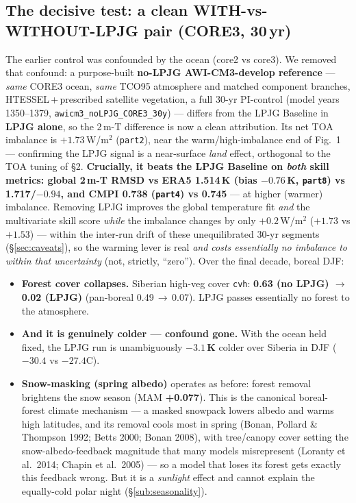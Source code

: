 \documentclass[10pt]{article}
\begin{document}
\subsection{The decisive test: a clean WITH-vs-WITHOUT-LPJG pair (CORE3, 30\,yr)}\label{sub:withwithout}
The earlier control was confounded by the ocean (core2 vs core3). We removed that confound: a purpose-built
\textbf{no-LPJG AWI-CM3-develop reference} --- \emph{same} CORE3 ocean, \emph{same} TCO95 atmosphere and matched
component branches, HTESSEL\,+\,prescribed satellite vegetation, a full 30-yr PI-control (model years 1350--1379,
\texttt{awicm3\_noLPJG\_CORE3\_30y}) --- differs from the LPJG Baseline in \textbf{LPJG alone}, so the 2\,m-T
difference is now a clean attribution. Its net TOA imbalance is $+1.73$\,W/m$^2$ (\texttt{part2}), near the
warm/high-imbalance end of Fig.~1 --- confirming the LPJG signal is a near-surface \emph{land} effect, orthogonal
to the TOA tuning of \S2. \textbf{Crucially, it beats the LPJG Baseline on \emph{both} skill metrics: global 2\,m-T RMSD vs ERA5 1.514\,K
(bias $-0.76$\,K, \texttt{part8}) vs 1.717/$-0.94$, and CMPI 0.738 (\texttt{part4}) vs 0.745} --- at higher
(warmer) imbalance. Removing LPJG improves the global temperature fit \emph{and} the multivariate skill score
\emph{while} the imbalance changes by only $+0.2$\,W/m$^2$ ($+1.73$ vs $+1.53$) --- within the inter-run drift of
these unequilibrated 30-yr segments (\S\ref{sec:caveats}), so the warming lever is real \emph{and costs essentially
no imbalance to within that uncertainty} (not, strictly, ``zero''). Over the final decade, boreal DJF:
\begin{itemize}\itemsep1pt
\item \textbf{Forest cover collapses.} Siberian high-veg cover \texttt{cvh}: \textbf{0.63 (no LPJG) $\to$ 0.02
(LPJG)} (pan-boreal 0.49\,$\to$\,0.07). LPJG passes essentially no forest to the atmosphere.
\item \textbf{And it is genuinely colder --- confound gone.} With the ocean held fixed, the LPJG run is
unambiguously \textbf{$-3.1$\,K} colder over Siberia in DJF ($-30.4$ vs $-27.4$\textdegree C).
\item \textbf{Snow-masking (spring albedo)} operates as before: forest removal brightens the snow season
(MAM \textbf{+0.077}). This is the canonical boreal-forest climate mechanism --- a masked snowpack lowers albedo and
warms high latitudes, and its removal cools most in spring (Bonan, Pollard \& Thompson 1992; Betts 2000; Bonan 2008),
with tree/canopy cover setting the snow-albedo-feedback magnitude that many models misrepresent (Loranty et al.\
2014; Chapin et al.\ 2005) --- so a model that loses its forest gets exactly this feedback wrong. But it is a
\emph{sunlight} effect and cannot explain the equally-cold polar night (\S\ref{sub:seasonality}).
\end{itemize}
\end{document}
